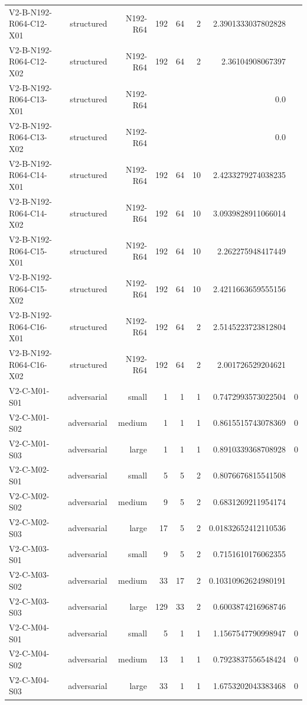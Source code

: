 {\begin{longtable}{lrrrrrrr}
V2-B-N192-R064-C12-X01 & structured & N192-R64 & 192 & 64 & 2 & 2.3901333037802828 &  \\
V2-B-N192-R064-C12-X02 & structured & N192-R64 & 192 & 64 & 2 & 2.36104908067397 &  \\
V2-B-N192-R064-C13-X01 & structured & N192-R64 &  &  &  & 0.0 &  \\
V2-B-N192-R064-C13-X02 & structured & N192-R64 &  &  &  & 0.0 &  \\
V2-B-N192-R064-C14-X01 & structured & N192-R64 & 192 & 64 & 10 & 2.4233279274038235 &  \\
V2-B-N192-R064-C14-X02 & structured & N192-R64 & 192 & 64 & 10 & 3.0939828911066014 &  \\
V2-B-N192-R064-C15-X01 & structured & N192-R64 & 192 & 64 & 10 & 2.262275948417449 &  \\
V2-B-N192-R064-C15-X02 & structured & N192-R64 & 192 & 64 & 10 & 2.4211663659555156 &  \\
V2-B-N192-R064-C16-X01 & structured & N192-R64 & 192 & 64 & 2 & 2.5145223723812804 &  \\
V2-B-N192-R064-C16-X02 & structured & N192-R64 & 192 & 64 & 2 & 2.001726529204621 &  \\
V2-C-M01-S01 & adversarial & small & 1 & 1 & 1 & 0.7472993573022504 & 0 \\
V2-C-M01-S02 & adversarial & medium & 1 & 1 & 1 & 0.8615515743078369 & 0 \\
V2-C-M01-S03 & adversarial & large & 1 & 1 & 1 & 0.8910339368708928 & 0 \\
V2-C-M02-S01 & adversarial & small & 5 & 5 & 2 & 0.8076676815541508 &  \\
V2-C-M02-S02 & adversarial & medium & 9 & 5 & 2 & 0.6831269211954174 &  \\
V2-C-M02-S03 & adversarial & large & 17 & 5 & 2 & 0.01832652412110536 &  \\
V2-C-M03-S01 & adversarial & small & 9 & 5 & 2 & 0.7151610176062355 &  \\
V2-C-M03-S02 & adversarial & medium & 33 & 17 & 2 & 0.10310962624980191 &  \\
V2-C-M03-S03 & adversarial & large & 129 & 33 & 2 & 0.6003874216968746 &  \\
V2-C-M04-S01 & adversarial & small & 5 & 1 & 1 & 1.1567547790998947 & 0 \\
V2-C-M04-S02 & adversarial & medium & 13 & 1 & 1 & 0.7923837556548424 & 0 \\
V2-C-M04-S03 & adversarial & large & 33 & 1 & 1 & 1.6753202043383468 & 0 \\

\end{longtable}}
